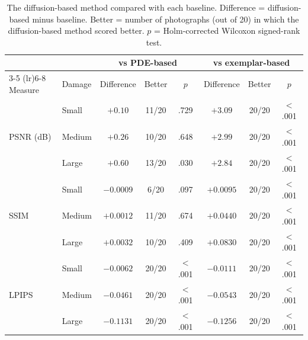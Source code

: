 \documentclass[conference]{IEEEtran}
\begin{document}
\begin{table}[!b]
  \centering
  \renewcommand{\arraystretch}{1.15}
  \begin{tabular}{llcccccc}
    \toprule
    & & \multicolumn{3}{c}{vs PDE-based} & \multicolumn{3}{c}{vs exemplar-based} \\
    \cmidrule(lr){3-5} \cmidrule(lr){6-8}
    Measure & Damage & Difference & Better & $p$ & Difference & Better & $p$ \\
    \midrule
    \multirow{3}{*}{PSNR (dB)}
      & Small  & $+0.10$ & 11/20 & .729 & $+3.09$ & 20/20 & $<$ .001 \\
      & Medium & $+0.26$ & 10/20 & .648 & $+2.99$ & 20/20 & $<$ .001 \\
      & Large  & $+0.60$ & 13/20 & .030 & $+2.84$ & 20/20 & $<$ .001 \\
    \midrule
    \multirow{3}{*}{SSIM}
      & Small  & $-0.0009$ & 6/20  & .097 & $+0.0095$ & 20/20 & $<$ .001 \\
      & Medium & $+0.0012$ & 11/20 & .674 & $+0.0440$ & 20/20 & $<$ .001 \\
      & Large  & $+0.0032$ & 10/20 & .409 & $+0.0830$ & 20/20 & $<$ .001 \\
    \midrule
    \multirow{3}{*}{LPIPS}
      & Small  & $-0.0062$ & 20/20 & $<$ .001 & $-0.0111$ & 20/20 & $<$ .001 \\
      & Medium & $-0.0461$ & 20/20 & $<$ .001 & $-0.0543$ & 20/20 & $<$ .001 \\
      & Large  & $-0.1131$ & 20/20 & $<$ .001 & $-0.1256$ & 20/20 & $<$ .001 \\
    \bottomrule
  \end{tabular}
  \vspace{4pt}
  \caption{The diffusion-based method compared with each baseline. Difference = diffusion-based minus baseline. Better = number of photographs (out of 20) in which the diffusion-based method scored better. $p$ = Holm-corrected Wilcoxon signed-rank test.}
  \label{tab:pairwise}
\end{table}
\end{document}
